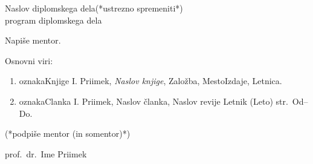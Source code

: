 \begin{center}
    \large
    Naslov diplomskega dela(*ustrezno spremeniti*)\\\small program diplomskega dela
  \end{center}

  Napi\v se mentor.


  Osnovni viri:
  \begin{enumerate}
  \item{oznakaKnjige} I. Priimek, \emph{Naslov knjige}, Zalo\v zba, MestoIzdaje, Letnica.
  \item{oznakaClanka} I. Priimek, Naslov \v clanka, Naslov revije Letnik (Leto) str.\ Od--Do.
  \end{enumerate}

  (*podpi\v se mentor (in somentor)*)


  \vspace{1cm}
  \begin{flushright}
    prof.\ dr.\ Ime Priimek\\
  \end{flushright}


